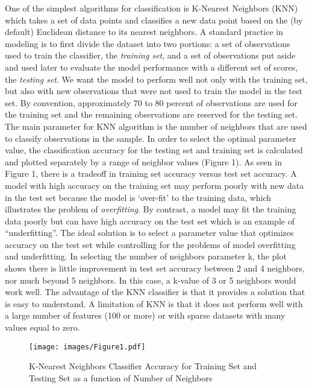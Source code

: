 \documentclass[sigconf]{acmart}
\begin{document}
One of the simplest algorithms for classification is K-Nearest Neighbors (KNN)
which takes a set of data points and classifies a new data point based on the
(by default) Euclidean distance to its nearest neighbors. A standard practice 
in modeling is to first divide the dataset into two portions: a set of 
observations used to train the classifier, the \emph{training set}, and a 
set of observations put aside and used later to evaluate the model performance 
with a different set of scores, the \emph{testing set}.  We want the model 
to perform well not only with the training set, but also with new observations 
that were not used to train the model in the test set. By convention, 
approximately 70 to 80 percent of observations are used for the training set 
and the remaining observations are reserved for the testing set. The main 
parameter for KNN algorithm is the number of neighbors that are used to 
classify observations in the sample. In order to select the optimal parameter
value, the classification accuracy for the testing set and training set is
calculated and plotted separately by a range of neighbor values (Figure 1). 
As seen in Figure 1, there is a tradeoff in training set accuracy versus 
test set accuracy. A model with high accuracy on the training set may 
perform poorly with new data in the test set because the model is `over-fit' 
to the training data, which illustrates the problem of \emph{overfitting}. 
By contrast, a model may fit the training data poorly but can have high
accuracy on the test set  which is an example of ``underfitting''. The 
ideal solution is to select a parameter value that optimizes accuracy on
the test set while controlling for the problems of model overfitting 
and underfitting. In selecting the number of neighbors parameter k, the 
plot shows there is little improvement in test set accuracy between 2 and 
4 neighbors, nor much beyond 5 neighbors. In this case, a k-value of 
3 or 5 neighbors would work well. The advantage of the KNN classifier 
is that it provides a solution that is easy to understand. A limitation 
of KNN is that it does not perform well with a large number of features 
(100 or more) or with sparse datasets with many values equal to zero. 

\begin{figure}[!ht]
  \centering\texttt{[image: images/Figure1.pdf]}
  \caption{K-Nearest Neighbors Classifier Accuracy for Training Set and 
  Testing Set as a function of Number of Neighbors}
  \label{f:Figure1}
\end{figure}
\end{document}
